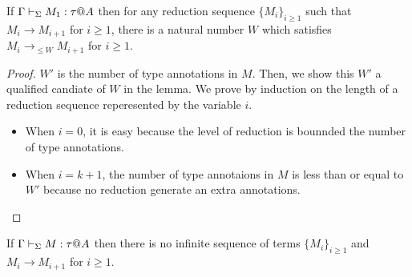 \begin{lemma}
    \label{lemma:UpperBoundOfLevel}
    If \( \G\V M_1:\tau@A \) then for any reduction sequence $\{M_i\}_{i\ge1}$ such that $M_i \longrightarrow M_{i+1}$ for $i\ge 1$, there is a natural number \( W \) which satisfies $M_i \longrightarrow_{\le W} M_{i+1}$ for $i\ge 1$.
\end{lemma}

\begin{proof}
    \( W' \) is the number of type annotations in \( M \).
    Then, we show this \( W' \) a qualified candiate of \( W \) in the lemma.
    We prove by induction on the length of a reduction sequence reperesented by the variable \( i \).
    \begin{itemize}
        \item When \( i = 0 \),
            it is easy because the level of reduction is bounnded the number of type annotations.
        \item When \( i = k + 1 \),
            the number of type annotaions in \( M \) is less than or equal to \( W' \) because no reduction generate an extra annotations.
    \end{itemize}
\end{proof}

\begin{theorem}
    \label{theorem:StrongNormalization}
    If \( \G\V M:\tau@A \) then there is no infinite sequence of terms $\{M_i\}_{i\ge1}$ and $M_i \longrightarrow M_{i+1}$ for $i\ge 1$.
\end{theorem}


